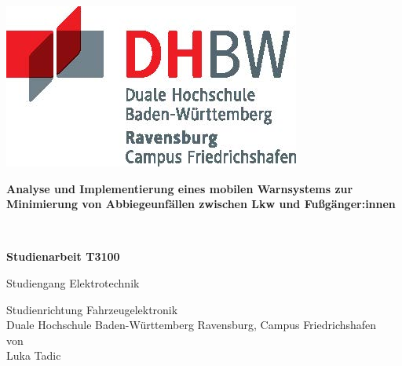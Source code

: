 \documentclass{scrbook} %
\newcommand{\titel}{Analyse und Implementierung eines mobilen Warnsystems zur Minimierung von Abbiegeunfällen zwischen Lkw und Fußgänger:innen}
\newcommand{\untertitel}{}
\newcommand{\arbeit}{Studienarbeit T3100}
\newcommand{\studiengang}{Elektrotechnik}
\newcommand{\studienrichtung}{Fahrzeugelektronik}
\newcommand{\autor}{Luka Tadic}
\begin{document}
\thispagestyle{plain}
\hypersetup{pageanchor=false}

\begin{titlepage}
\enlargethispage{4.0cm}
\sffamily  %

\parbox{0.5\linewidth}{
    \begin{flushleft}
    \end{flushleft}
}
\parbox{0.5\linewidth}{
    \begin{flushright}
        \includegraphics[width=0.4\linewidth]{images/DHBW_d_R_FN_46mm_4c}\\[5ex]
    \end{flushright}
}

\begin{center}

{\fontsize{20.74pt}{24pt}\selectfont
\textbf{\titel}\\[1.5ex]}

{\fontsize{14pt}{17pt}\selectfont
\textbf{\untertitel}\\[5ex]}

{\fontsize{17pt}{20pt}\selectfont
\textbf{\arbeit}\\[2ex]}

{\fontsize{14pt}{17pt}\selectfont
Studiengang \studiengang\\[2ex]}

{\fontsize{12pt}{14pt}\selectfont
Studienrichtung \studienrichtung\\[1ex]
Duale Hochschule Baden-Württemberg Ravensburg, Campus Friedrichshafen\\[5ex]
von\\[1ex]
\autor\\[15ex]}

\end{center}


\end{titlepage}
\end{document}
